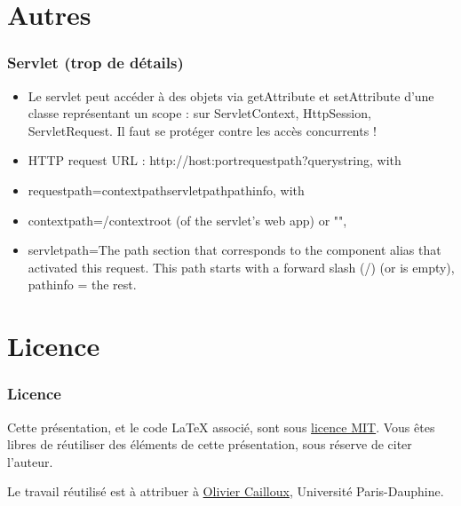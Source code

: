\documentclass[english, french]{beamer}
\begin{document}
\section{Autres}
\begin{frame}
	\frametitle{Servlet (trop de détails)}
	\begin{itemize}
		\item Le servlet peut accéder à des objets via getAttribute et setAttribute d’une classe représentant un scope : sur ServletContext, HttpSession, ServletRequest. Il faut se protéger contre les accès concurrents !
		\item HTTP request URL : http://host:portrequestpath?querystring, with
		\item requestpath=contextpathservletpathpathinfo, with 
		\item contextpath=/contextroot (of the servlet’s web app) or "", 
		\item servletpath=The path section that corresponds to the component alias that activated this request. This path starts with a forward slash (/) (or is empty), pathinfo = the rest.
	\end{itemize}
\end{frame}

\appendix
\section{Licence}
\begin{frame}
	\frametitle{Licence}
	Cette présentation, et le code LaTeX associé, sont sous \href{http://opensource.org/licenses/MIT}{licence MIT}. Vous êtes libres de réutiliser des éléments de cette présentation, sous réserve de citer l’auteur.
	
	Le travail réutilisé est à attribuer à \href{http://www.lamsade.dauphine.fr/~ocailloux/}{Olivier Cailloux}, Université Paris-Dauphine.
\end{frame}
\end{document}
